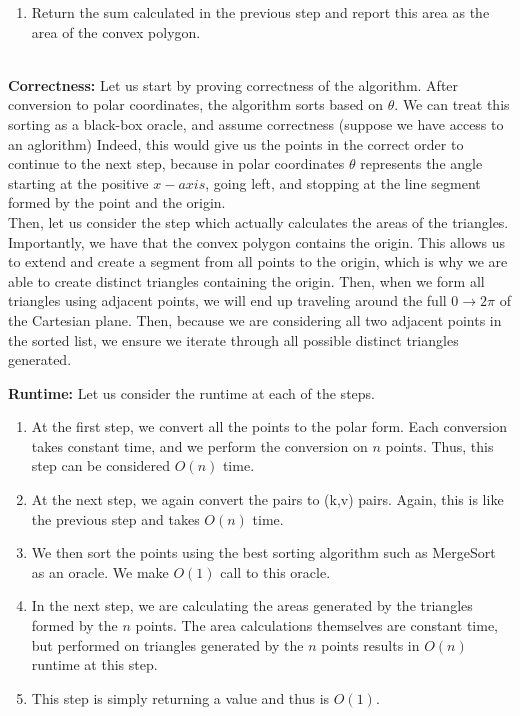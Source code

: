 \documentclass[11pt]{article}
\begin{document}
\begin{enumerate}
\begin{enumerate}
\begin{enumerate}
            
            \item Return the sum calculated in the previous step and report this area as the area of the convex polygon. 
        \end{enumerate} \\
        
        \textbf{Correctness: }Let us start by proving correctness of the algorithm. After conversion to polar coordinates, the algorithm sorts based on $\theta$. We can treat this sorting as a black-box oracle, and assume correctness (suppose we have access to an aglorithm) Indeed, this would give us the points in the correct order to continue to the next step, because in polar coordinates $\theta$ represents the angle starting at the positive $x-axis$, going left, and stopping at the line segment formed by the point and the origin. \\
        
        Then, let us consider the step which actually calculates the areas of the triangles. Importantly, we have that the convex polygon contains the origin. This allows us to extend and create a segment from all points to the origin, which is why we are able to create distinct triangles containing the origin. Then, when we form all triangles using adjacent points, we will end up traveling around the full $0 \to 2\pi$ of the Cartesian plane. Then, because we are considering all two adjacent points in the sorted list, we ensure we iterate through all possible distinct triangles generated. 
        
        \textbf{Runtime: } Let us consider the runtime at each of the steps.
        
        \begin{enumerate}[i]
            \item At the first step, we convert all the points to the polar form. Each conversion takes constant time, and we perform the conversion on $n$ points. Thus, this step can be considered $O(n)$ time. 
            \item At the next step, we again convert the pairs to (k,v) pairs. Again, this is like the previous step and takes $O(n)$ time. 
            \item We then sort the points using the best sorting algorithm such as MergeSort as an oracle. We make $O(1)$ call to this oracle.
            \item In the next step, we are calculating the areas generated by the triangles formed by the $n$ points. The area calculations themselves are constant time, but performed on triangles generated by the $n$ points results in $O(n)$ runtime at this step.
            \item This step is simply returning a value and thus is $O(1)$.
            

\end{enumerate}
\end{enumerate}
\end{enumerate}
\end{document}
